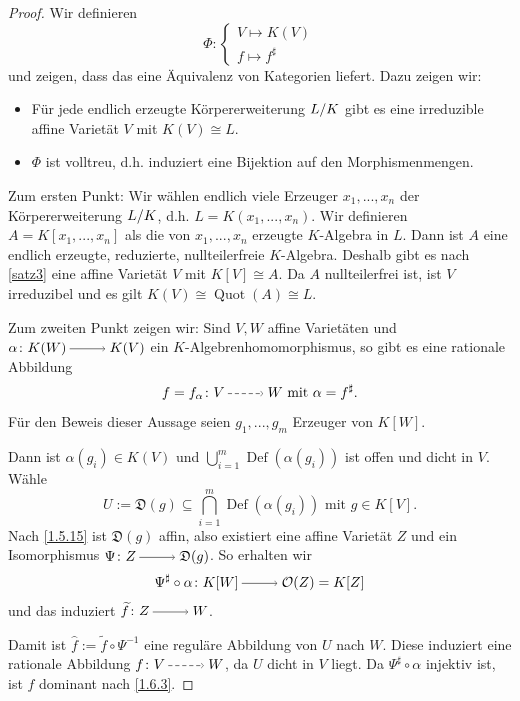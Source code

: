 \documentclass[a4paper,12pt,index=toc]{scrbook}
\theoremstyle{keinenummern} %
\def\O{\mathcal{O}}
\newcommand{\D}{\mathfrak{D}}
\newcommand{\Def}{\operatorname{Def}}
\newcommand{\Quot}{\operatorname{Quot}}
\renewcommand{\dotsc}{\ensuremath{\!...}}
\newcommand{\schlange}[1]{\widetilde{#1}}
\newcommand{\dach}{\widehat}
\begin{document}
\begin{proof} Wir definieren
\begin{equation*}\Phi\colon\begin{cases}V\mapsto K(V)\\f\mapsto f^{\sharp}\end{cases}\end{equation*}
und zeigen, dass das eine Äquivalenz von Kategorien liefert. Dazu zeigen wir: 
  \begin{itemize}
  \item Für jede endlich erzeugte Körpererweiterung $\Quotient{L}{K}$ gibt es eine irreduzible affine Varietät $V$ mit $K(V)\cong L$.
  \item $\Phi$ ist volltreu, d.h. induziert eine Bijektion auf den Morphismenmengen.
  \end{itemize}
Zum ersten Punkt: Wir wählen endlich viele Erzeuger $x_1,\dotsc,x_n$ der Körpererweiterung $\Quotient{L}{K}$, d.h. $L=K(x_1,\dotsc,x_n)$. Wir definieren $A=K[x_1,\dotsc,x_n]$ als die von $x_1,\dotsc,x_n$ erzeugte $K$-Algebra in $L$. Dann ist $A$ eine endlich erzeugte, reduzierte, nullteilerfreie
$K$-Algebra. Deshalb gibt es nach \cref{satz3} eine affine Varietät $V$ mit $K[V]\cong A$. Da $A$ nullteilerfrei ist, ist $V$ irreduzibel und es gilt $K(V)\cong \Quot(A)\cong L$.

Zum zweiten Punkt zeigen wir: Sind $V,W$ affine Varietäten und $\alpha \colon K(W)\ra K(V)$ ein $K$-Algebrenhomomorphismus, so gibt es eine rationale Abbildung \begin{equation*}f=f_{\alpha}\colon V\ppf W\text{ mit }\alpha=f^{\sharp}.\end{equation*}
%
Für den Beweis dieser Aussage seien $g_1,\dotsc,g_m$ Erzeuger von $K[W]$. 

Dann ist $\alpha(g_i)\in K(V)$ und $\bigcup_{i=1}^{m} \Def(\alpha(g_i))$ ist offen und dicht in $V$. Wähle 
\begin{equation*}U:=\D(g)\subseteq \bigcap_{i=1}^{m} \Def(\alpha(g_i))\text{ mit }g \in K[V].\end{equation*}
Nach \cref{1.5.15} ist  $\D(g)$ affin, also existiert eine affine Varietät $Z$ und ein Isomorphismus $\Psi \colon Z\ra \D(g)$.
So erhalten wir
\begin{equation*}\Psi^{\sharp}\circ \alpha \colon K[W] \ra \O(Z)=K[Z]\end{equation*}
und das induziert $\schlange{f} \colon Z\ra W$.

Damit ist $\dach{f}:=\schlange{f}\circ \Psi^{-1}$ eine reguläre Abbildung von $U$ nach $W$. Diese induziert eine rationale Abbildung $f \colon V\ppf W$, da $U$ dicht in $V$ liegt. Da $\Psi^{\sharp}\circ \alpha$ injektiv ist, ist $f$ dominant nach \cref{1.6.3}.


\end{proof}
\end{document}
